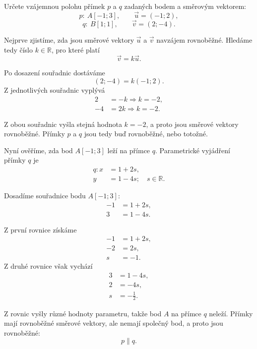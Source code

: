 \begin{example}\label{exa:Parallel_parametric_lines}
    Určete vzájemnou polohu přímek $p$ a $q$ zadaných bodem
    a směrovým vektorem:
    \[
        p:\ A[-1;3],\qquad \vec{u}=(-1;2),
    \]
    \[
        q:\ B[1;1],\qquad \vec{v}=(2;-4).
    \]

    Nejprve zjistíme, zda jsou směrové vektory $\vec{u}$ a $\vec{v}$
    navzájem rovnoběžné. Hledáme tedy číslo $k\in\mathbb{R}$, pro které
    platí
    \[
        \vec{v}=k\vec{u}.
    \]

    Po dosazení souřadnic dostáváme
    \[
        (2;-4)=k(-1;2).
    \]
    Z jednotlivých souřadnic vyplývá
    \begin{align*}
        2 &= -k \Rightarrow  k=-2,\\
        -4 &= 2k \Rightarrow k=-2.
    \end{align*}

    Z obou souřadnic vyšla stejná hodnota $k=-2$, a proto jsou směrové
    vektory rovnoběžné. Přímky $p$ a $q$ jsou tedy buď rovnoběžné,
    nebo totožné.

    Nyní ověříme, zda bod $A[-1;3]$ leží na přímce $q$. Parametrické
    vyjádření přímky $q$ je
    \begin{align*}
        q: x &= 1+2s,\\
           y &= 1-4s;
           \quad s\in\mathbb{R}.
    \end{align*}

    Dosadíme souřadnice bodu $A[-1;3]$:
    \begin{align*}
        -1 &= 1+2s,\\
        3 &= 1-4s.
    \end{align*}

    Z první rovnice získáme
    \begin{align*}
        -1 &= 1+2s,\\
        -2 &= 2s,\\
        s &= -1.
    \end{align*}
    Z druhé rovnice však vychází
    \begin{align*}
        3 &= 1-4s,\\
        2 &= -4s,\\
        s &= -\tfrac{1}{2}.
    \end{align*}

    Z rovnic vyšly různé hodnoty parametru, takže bod $A$ na přímce
    $q$ neleží. Přímky mají rovnoběžné směrové vektory, ale nemají
    společný bod, a proto jsou rovnoběžné:
    \[
        p\parallel q.
    \]
\end{example}

